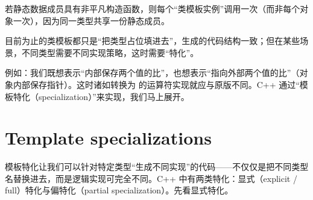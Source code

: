 若静态数据成员具有非平凡构造函数，则每个“类模板实例”调用一次（而非每个对象一次），因为同一类型共享一份静态成员。

目前为止的类模板都只是“把类型占位填进去”，生成的代码结构一致；但在某些场景，不同类型需要不同实现策略，这时需要“特化”。

例如：我们既想表示“内部保存两个值的比”，也想表示“指向外部两个值的比”（对象内部保存指针）。这时诸如转换为  的运算符实现就应与原版不同。C++ 通过“模板特化（specialization）”来实现，我们马上展开。

\section{Template specializations}
模板特化让我们可以针对特定类型“生成不同实现”的代码——不仅仅是把不同类型名替换进去，而是逻辑实现可完全不同。C++ 中有两类特化：显式（explicit / full）特化与偏特化（partial specialization）。先看显式特化。

